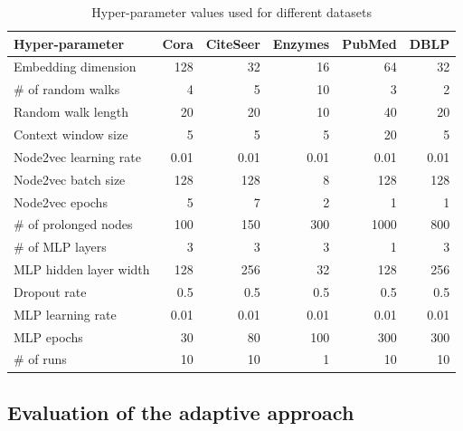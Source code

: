 \begin{table}
  \caption{Hyper-parameter values used for different datasets}
  \label{tab:hyperparameter-values}
  \begin{tabular}{lrrrrr}
    \toprule
    Hyper-parameter        & Cora & CiteSeer & Enzymes & PubMed & DBLP \\
    \midrule
    Embedding dimension    & 128  & 32       & 16      & 64     & 32   \\
    \# of random walks     & 4    & 5        & 10      & 3      & 2    \\
    Random walk length     & 20   & 20       & 10      & 40     & 20   \\
    Context window size    & 5    & 5        & 5       & 20     & 5    \\
    Node2vec learning rate & 0.01 & 0.01     & 0.01    & 0.01   & 0.01 \\
    Node2vec batch size    & 128  & 128      & 8       & 128    & 128  \\
    Node2vec epochs        & 5    & 7        & 2       & 1      & 1    \\
    \# of prolonged nodes  & 100  & 150      & 300     & 1000   & 800  \\
    \# of MLP layers       & 3    & 3        & 3       & 1      & 3    \\
    MLP hidden layer width & 128  & 256      & 32      & 128    & 256  \\
    Dropout rate           & 0.5  & 0.5      & 0.5     & 0.5    & 0.5  \\
    MLP learning rate      & 0.01 & 0.01     & 0.01    & 0.01   & 0.01 \\
    MLP epochs             & 30   & 80       & 100     & 300    & 300  \\
    \# of runs             & 10   & 10       & 1       & 10     & 10   \\
    \bottomrule
  \end{tabular}
\end{table}

\subsection{Evaluation of the adaptive approach}


